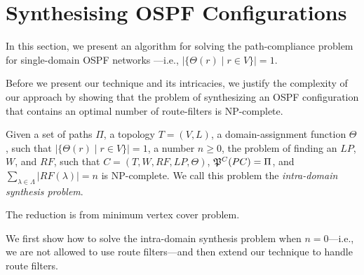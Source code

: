 \section{Synthesising OSPF Configurations} \label{sec:synthesis}
In this section, we present an algorithm for 
solving the path-compliance problem for 
single-domain OSPF networks
---i.e., $|\{\Theta(r) \mid r\in V\}|=1$.


Before we present our technique and its intricacies,
we justify the complexity of our approach by showing that
the problem of synthesizing an OSPF configuration
that contains an optimal number of route-filters is NP-complete.

\begin{theorem}
Given a set of paths $\Pi$,
a topology $T=(V,L)$,
a domain-assignment function $\Theta$, such that $|\{\Theta(r) \mid r\in V\}|=1$,
a number $n\geq 0$,
the problem of finding 
an $LP$, $W$, and $RF$,  such that
$C=(T,W,RF,LP,\Theta)$,
$\mathfrak{P}^C(PC) = \Pi$,
and 
$\sum_{\lambda\in\Lambda} |RF(\lambda)|=n$ is NP-complete.
We call this problem the \emph{intra-domain synthesis problem}.
\end{theorem}
\iffull

\else
The reduction is from minimum vertex cover problem.
\fi

We first show how to solve the intra-domain synthesis problem when $n=0$---i.e., we are not allowed to use route filters---and
then extend our technique to handle route filters.

